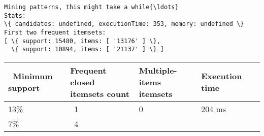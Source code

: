 \documentclass[11pt]{article}
\begin{document}
    \begin{Verbatim}[commandchars=\\\{\}]
Mining patterns, this might take a while{\ldots}
Stats:
\{ candidates: undefined, executionTime: 353, memory: undefined \}
First two frequent itemsets:
[ \{ support: 15480, items: [ '13176' ] \},
  \{ support: 10894, items: [ '21137' ] \} ]

    \end{Verbatim}

    \begin{longtable}[]{@{}lllll@{}}
\toprule
\begin{minipage}[b]{0.14\columnwidth}\raggedright
~Minimum support\strut
\end{minipage} & \begin{minipage}[b]{0.18\columnwidth}\raggedright
Frequent closed itemsets count\strut
\end{minipage} & \begin{minipage}[b]{0.20\columnwidth}\raggedright
Multiple-items itemsets\strut
\end{minipage} & \begin{minipage}[b]{0.20\columnwidth}\raggedright
Execution time\strut
\end{minipage} & \begin{minipage}[b]{0.13\columnwidth}\raggedright
\strut
\end{minipage}\tabularnewline
\midrule
\endhead
\begin{minipage}[t]{0.14\columnwidth}\raggedright
13\%\strut
\end{minipage} & \begin{minipage}[t]{0.18\columnwidth}\raggedright
~1\strut
\end{minipage} & \begin{minipage}[t]{0.20\columnwidth}\raggedright
0\strut
\end{minipage} & \begin{minipage}[t]{0.20\columnwidth}\raggedright
204 ms\strut
\end{minipage} & \begin{minipage}[t]{0.13\columnwidth}\raggedright
\strut
\end{minipage}\tabularnewline
\begin{minipage}[t]{0.14\columnwidth}\raggedright
7\%\strut
\end{minipage} & \begin{minipage}[t]{0.18\columnwidth}\raggedright
~4\strut
\end{minipage} & \begin{minipage}[t]{0.20\columnwidth}\raggedright

\end{minipage}
\end{longtable}
\end{document}
